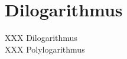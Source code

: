 %
%
%
\section{Dilogarithmus
\label{buch:exponential:section:dilogarithmus}}

XXX Dilogarithmus \\
XXX Polylogarithmus
